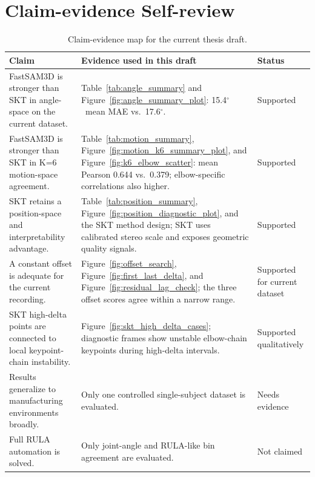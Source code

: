 \documentclass[12pt,a4paper]{article}
\newcommand{\degr}{\ensuremath{^\circ}}
\begin{document}
\FloatBarrier
\clearpage
\section{Claim-evidence Self-review}

\begin{table}[H]
  \centering
  \caption{Claim-evidence map for the current thesis draft.}
  \label{tab:claim_evidence}
  \small
  \renewcommand{\arraystretch}{1.12}
  \begin{tabularx}{\linewidth}{p{4.0cm}Xp{1.9cm}}
    \toprule
    Claim & Evidence used in this draft & Status \\
    \midrule
    FastSAM3D is stronger than SKT in angle-space on the current dataset.
    & Table~\ref{tab:angle_summary} and Figure~\ref{fig:angle_summary_plot}: 15.4\degr\ mean MAE vs.\ 17.6\degr.
    & Supported \\
    FastSAM3D is stronger than SKT in K=6 motion-space agreement.
    & Table~\ref{tab:motion_summary}, Figure~\ref{fig:motion_k6_summary_plot}, and Figure~\ref{fig:k6_elbow_scatter}: mean Pearson 0.644 vs.\ 0.379; elbow-specific correlations also higher.
    & Supported \\
    SKT retains a position-space and interpretability advantage.
    & Table~\ref{tab:position_summary}, Figure~\ref{fig:position_diagnostic_plot}, and the SKT method design; SKT uses calibrated stereo scale and exposes geometric quality signals.
    & Supported \\
    A constant offset is adequate for the current recording.
    & Figure~\ref{fig:offset_search}, Figure~\ref{fig:first_last_delta}, and Figure~\ref{fig:residual_lag_check}; the three offset scores agree within a narrow range.
    & Supported for current dataset \\
    SKT high-delta points are connected to local keypoint-chain instability.
    & Figure~\ref{fig:skt_high_delta_cases}; diagnostic frames show unstable elbow-chain keypoints during high-delta intervals.
    & Supported qualitatively \\
    Results generalize to manufacturing environments broadly.
    & Only one controlled single-subject dataset is evaluated.
    & Needs evidence \\
    Full RULA automation is solved.
    & Only joint-angle and RULA-like bin agreement are evaluated.
    & Not claimed \\
    \bottomrule
  \end{tabularx}
\end{table}
\end{document}
